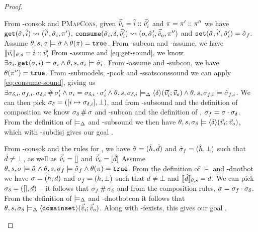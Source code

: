 \begin{proof}
\begin{hypvlist}
 From \hyp{consok} and \textsc{PMapCons}, given $\vec{\hat{v}}_i=\hat{i}::\vec{\hat{v}}_i'$ and $\pi=\pi'::\pi''$ we have $\texttt{get}(\hat{\sigma},\hat{i})\rightsquigarrow(\hat{i}', \hat{\sigma}_i, \pi')$, ${\texttt{consume}(\hat{\sigma}_i,\delta,\vec{\hat{v}}_i')\rightsquigarrow (o,\hat{\sigma}_i',\vec{\hat{v}}_o,\pi'')}$ and $\texttt{set}(\hat{\sigma},\hat{i}',\hat{\sigma}_i')=\hat{\sigma}_f$.
 Assume $\theta,s,\sigma\models \hat{\sigma} \land \theta(\pi)=\texttt{true}$.
 From \hyp{subcon} and \hyp{assume}, we have $\llbracket\vec{v}_i\rrbracket_{\theta,s}=i::\vec{v}_i'$
 From \hyp{assume} and \ref{eq:get-sound}, we know $\exists \sigma_i\ldotp \texttt{get}(\sigma,i)=\sigma_i \land \theta,s,\sigma_i\models\hat{\sigma}_i$.
 From \hyp{assume} and \hyp{subcon}, we have $\theta(\pi'')=\texttt{true}$.
 From \hyp{submodels}, \hyp{pcok} and \hyp{ssatsconssound} we can apply \ref{eq:consume-sound}, giving us $\exists \sigma_{\delta,i}, \sigma_{f,i}\ldotp \sigma_{\delta,i}\operatorname{\#} \sigma_i' \land \sigma_i=\sigma_{\delta,i}\cdot\sigma_i' \land \theta,s,\sigma_{\delta,i}\models_{\Delta} \left<\delta\right>\!(\vec{v}_i';\vec{v}_o) \land \theta,s,\sigma_{f,i}\models\hat{\sigma}_{f,i}$.
 We can then pick $\sigma_\delta=([i\mapsto \sigma_{\delta,i}], \bot)$, and from \hyp{subsound} and the definition of composition we know $\sigma_\delta\operatorname{\#}\sigma$ and \hyp{subcon} and the definition of , $\sigma_f=\sigma\cdot\sigma_\delta$.
 From the definition of $\models_{\Delta}$ and \hyp{subsound} we then have $\theta,s,\sigma_\delta\models\left<\delta\right>\!(\vec{v}_i;\vec{v}_o)$, which with \hyp{subdisj} gives our goal .
\end{hypvlist}

\pfcase{$\delta = \domainset$}

\begin{hypvlist}
 From \hyp{consok} and the rules for \consume{}, we have $\hat{\sigma}=(\hat{h},\hat{d})$ and $\hat{\sigma}_f=(\hat{h},\bot)$ such that $\hat{d}\neq\bot$, as well as $\vec{\hat{v}}_i=[]$ and $\vec{\hat{v}}_o=[\hat{d}]$
 Assume $\theta,s,\sigma\models \hat{\sigma} \land \theta,s,\sigma_f\models \hat{\sigma}_f \land \theta(\pi)=\texttt{true}$.
 From the definition of $\models$ and \hyp{dnotbot} we have $\sigma=(h,d)$ and $\sigma_f=(h,\bot)$ such that $d\neq\bot$ and $\llbracket\hat{d}\rrbracket_{\theta,s}=d$.
 We can pick $\sigma_\delta=([],d)$ -- it follows that $\sigma_f\operatorname{\#}\sigma_\delta$ and from the composition rules, $\sigma=\sigma_f\cdot\sigma_\delta$.
 From the definition of $\models_{\Delta}$ and \hyp{dnotbotcon} it follows that $\theta,s,\sigma_\delta\models_{\Delta}\left<\texttt{domainset}\right>\!(\vec{\hat{v}}_i;\vec{\hat{v}}_o)$. Along with \hyp{fexists}, this gives our goal .
\end{hypvlist}


\end{proof}
